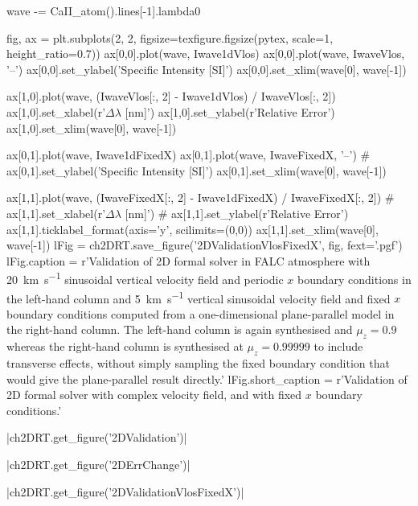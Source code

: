 \begin{pycode}[2DValidation]
wave -= CaII_atom().lines[-1].lambda0

fig, ax = plt.subplots(2, 2, figsize=texfigure.figsize(pytex, scale=1, height_ratio=0.7))
ax[0,0].plot(wave, Iwave1dVlos)
ax[0,0].plot(wave, IwaveVlos, '--')
ax[0,0].set_ylabel('Specific Intensity [SI]')
ax[0,0].set_xlim(wave[0], wave[-1])

ax[1,0].plot(wave, (IwaveVlos[:, 2] - Iwave1dVlos) / IwaveVlos[:, 2])
ax[1,0].set_xlabel(r'$\Delta\lambda$ [\si{\nano\metre}]')
ax[1,0].set_ylabel(r'Relative Error')
ax[1,0].set_xlim(wave[0], wave[-1])

ax[0,1].plot(wave, Iwave1dFixedX)
ax[0,1].plot(wave, IwaveFixedX, '--')
# ax[0,1].set_ylabel('Specific Intensity [SI]')
ax[0,1].set_xlim(wave[0], wave[-1])

ax[1,1].plot(wave, (IwaveFixedX[:, 2] - Iwave1dFixedX) / IwaveFixedX[:, 2])
# ax[1,1].set_xlabel(r'$\Delta\lambda$ [\si{\nano\metre}]')
# ax[1,1].set_ylabel(r'Relative Error')
ax[1,1].ticklabel_format(axis='y', scilimits=(0,0))
ax[1,1].set_xlim(wave[0], wave[-1])
lFig = ch2DRT.save_figure('2DValidationVlosFixedX', fig, fext='.pgf')
lFig.caption = r'Validation of 2D formal solver in FALC atmosphere with \SI{20}{\kilo\metre\per\second} sinusoidal vertical velocity field and periodic $x$ boundary conditions in the left-hand column and \SI{5}{\kilo\metre\per\second} vertical sinusoidal velocity field and fixed $x$ boundary conditions computed from a one-dimensional plane-parallel model in the right-hand column. The left-hand column is again synthesised and $\mu_z=0.9$ whereas the right-hand column is synthesised at $\mu_z=0.99999$ to include transverse effects, without simply sampling the fixed boundary condition that would give the plane-parallel result directly.'
lFig.short_caption = r'Validation of 2D formal solver with complex velocity field, and with fixed $x$ boundary conditions.'
\end{pycode}

\py[2DValidation]|ch2DRT.get_figure('2DValidation')|

\py[2DValidation]|ch2DRT.get_figure('2DErrChange')|

\py[2DValidation]|ch2DRT.get_figure('2DValidationVlosFixedX')|


